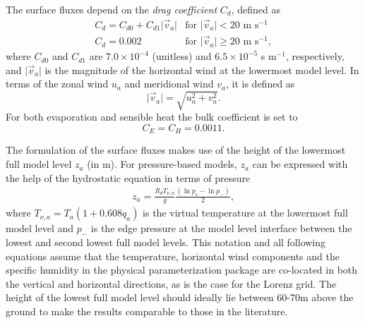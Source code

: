 \documentclass[times,doublespace]{fldauth}
\begin{document}
{\begin{appendix}
The surface fluxes depend on the \textit{drag coefficient} $C_d$, defined as
\begin{equation} \label{eq:DragCoefficient}
\begin{array}{ll}
C_d = C_{d0} + C_{d1} \vert \vec{v}_a \vert & \mbox{for $\vert \vec{v}_a \vert < 20$ m s$^{-1}$} \\ 
C_d = 0.002 & \mbox{for $\vert \vec{v}_a \vert \geq 20$ m s$^{-1}$}, 
\end{array}
\end{equation}
where $C_{d0}$ and $C_{d1}$ are $7.0 \times 10^{-4}$ (unitless) and $6.5 \times 10^{-5}$ s m$^{-1}$, respectively, and $\vert \vec{v}_a \vert$ is the magnitude of the horizontal wind at the lowermost model level.  In terms of the zonal wind $u_a$ and meridional wind $v_a$, it is defined as
\begin{equation}
\vert \vec{v}_a \vert = \sqrt{u_a^2 + v_a^2}.
\end{equation}  For both evaporation and sensible heat the bulk coefficient is set to
\begin{equation} \label{eq:BulkTransferCoefficient}
C_E = C_H = 0.0011.
\end{equation}

The formulation of the surface fluxes makes use of the height of the lowermost full model level $z_a$ (in m).  For pressure-based models, $z_a$ can be expressed with the help of the hydrostatic equation in terms of pressure
\begin{eqnarray} \label{eqn:za}
z_a = \frac{R_d T_{\nu,a}}{g} \frac{(\ln p_s- \ln p_-)}{2},
\end{eqnarray}
where $T_{\nu,a} = T_a (1+0.608 q_a)$ is the virtual temperature at the lowermost full model level and $p_-$ is the edge pressure at the model level interface between the lowest and second lowest full model levels. This notation and all following equations assume that the temperature, horizontal wind components and the specific humidity in the physical parameterization package are co-located in both the vertical and horizontal directions, as is the case for the Lorenz grid. The height of the lowest full model level should ideally lie between 60-70m above the ground to make the results comparable to those in the literature.


\end{appendix}}
\end{document}

